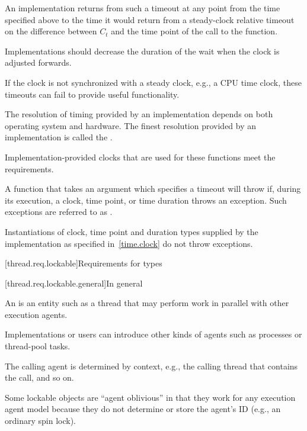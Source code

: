 An implementation returns from such a timeout at any point from the time specified above to
the time it would return from a steady-clock relative timeout on the difference between $C_t$
and the time point of the call to the  function.

\recommended
Implementations
should decrease the duration of the wait when the clock is adjusted forwards.

\pnum
\begin{note}
If the clock is not synchronized with a steady clock, e.g., a CPU time clock, these
timeouts can fail to provide useful functionality.
\end{note}

\pnum
The resolution of timing provided by an implementation depends on both operating system
and hardware. The finest resolution provided by an implementation is called the
.

\pnum
Implementation-provided clocks that are used for these functions meet the
 requirements.

\pnum
A function that takes an argument which specifies a timeout will throw if,
during its execution, a clock, time point, or time duration throws an exception.
Such exceptions are referred to as .
\begin{note}
Instantiations of clock, time point and duration types supplied by
the implementation as specified in~\ref{time.clock} do not throw exceptions.
\end{note}

[thread.req.lockable]{Requirements for  types}

[thread.req.lockable.general]{In general}

\pnum
An  is an entity such as a thread that may perform work in parallel with
other execution agents.
\begin{note}
Implementations or users can introduce other kinds of
agents such as processes or thread-pool tasks.
\end{note}
The calling agent is determined by
context, e.g., the calling thread that contains the call, and so on.

\pnum
\begin{note}
Some lockable objects are ``agent oblivious'' in that they work for any
execution agent model because they do not determine or store the agent's ID (e.g., an
ordinary spin lock).
\end{note}

